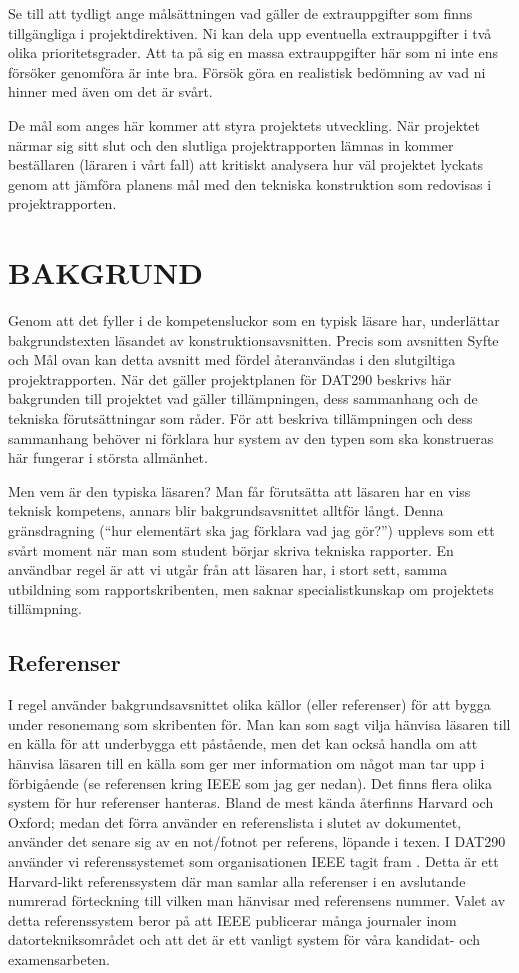 \documentclass[a4paper]{article}
\begin{document}
Se till att tydligt ange målsättningen vad gäller de extrauppgifter som
finns tillgängliga i projektdirektiven. Ni kan dela upp eventuella
extrauppgifter i två olika prioritetsgrader. Att ta på sig en massa
extrauppgifter här som ni inte ens försöker genomföra är inte bra.
Försök göra en realistisk bedömning av vad ni hinner med även om det är
svårt.

De mål som anges här kommer att styra projektets utveckling. När
projektet närmar sig sitt slut och den slutliga projektrapporten lämnas
in kommer beställaren (läraren i vårt fall) att kritiskt analysera hur
väl projektet lyckats genom att jämföra planens mål med den tekniska
konstruktion som redovisas i projektrapporten.


\section{BAKGRUND}


Genom att det fyller i de kompetensluckor som en typisk läsare har,
underlättar bakgrundstexten läsandet av konstruktionsavsnitten. Precis
som avsnitten Syfte och Mål ovan kan detta avsnitt med fördel
återanvändas i den slutgiltiga projektrapporten. När det gäller
projektplanen för DAT290 beskrivs här bakgrunden till projektet vad
gäller tillämpningen, dess sammanhang och de tekniska förutsättningar
som råder. För att beskriva tillämpningen och dess sammanhang behöver ni
förklara hur system av den typen som ska konstrueras här fungerar i
största allmänhet.

Men vem är den typiska läsaren? Man får förutsätta att läsaren har en
viss teknisk kompetens, annars blir bakgrundsavsnittet alltför långt.
Denna gränsdragning (“hur elementärt ska jag förklara vad jag gör?”)
upplevs som ett svårt moment när man som student börjar skriva tekniska
rapporter. En användbar regel är att vi utgår från att läsaren har, i
stort sett, samma utbildning som rapportskribenten, men saknar
specialistkunskap om projektets tillämpning.

\subsection{Referenser}


I regel använder bakgrundsavsnittet olika källor (eller referenser) för
att bygga under resonemang som skribenten för. Man kan som sagt vilja
hänvisa läsaren till en källa för att underbygga ett påstående, men det
kan också handla om att hänvisa läsaren till en källa som ger mer
information om något man tar upp i förbigående (se referensen kring IEEE
som jag ger nedan). Det finns flera olika system för hur referenser
hanteras. Bland de mest kända återfinns Harvard och Oxford; medan det
förra använder en referenslista i slutet av dokumentet, använder det
senare sig av en not/fotnot per referens, löpande i texen. I DAT290
använder vi referenssystemet som organisationen IEEE tagit fram \cite{hughen}. Detta
är ett Harvard-likt referenssystem där man samlar alla referenser i en
avslutande numrerad förteckning till vilken man hänvisar med referensens
nummer. Valet av detta referenssystem beror på att IEEE publicerar många
journaler inom datortekniksområdet och att det är ett vanligt system för
våra kandidat- och examensarbeten.
\end{document}
